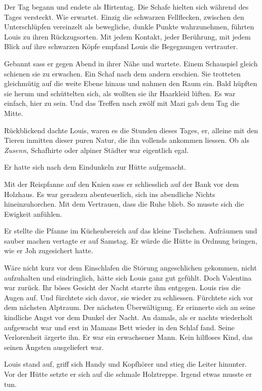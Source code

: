 Der Tag begann und endete als Hirtentag. Die Schafe hielten sich während
des Tages versteckt. Wie erwartet. Einzig die schwarzen Fellflecken,
zwischen den Unterschlüpfen vereinzelt als bewegliche, dunkle Punkte
wahrzunehmen, führten Louis zu ihren Rückzugsorten. Mit jedem Kontakt,
jeder Berührung, mit jedem Blick auf ihre schwarzen Köpfe empfand Louis
die Begegnungen vertrauter.

Gebannt sass er gegen Abend in ihrer Nähe und wartete. Einem Schauspiel
gleich schienen sie zu erwachen. Ein Schaf nach dem andern erschien. Sie
trotteten gleichmütig auf die weite Ebene hinaus und nahmen den Raum
ein. Bald hüpften sie herum und schüttelten sich, als wollten sie ihr
Haarkleid lüften. Es war einfach, hier zu sein. Und das Treffen nach
zwölf mit Mazi gab dem Tag die Mitte.

Rückblickend dachte Louis, waren es die Stunden dieses Tages, er,
alleine mit den Tieren inmitten dieser puren Natur, die ihn vollends
ankommen liessen. Ob als \emph{Zusenn,} Schafhirte oder alpiner Städter
war eigentlich egal.

Er hatte sich nach dem Eindunkeln zur Hütte aufgemacht.

Mit der Reispfanne auf den Knien sass er schliesslich auf der Bank vor
dem Holzhaus. Es war geradezu abenteuerlich, sich ins abendliche Nichts
hineinzuhorchen. Mit dem Vertrauen, dass die Ruhe blieb. So musste sich
die Ewigkeit anfühlen.

Er stellte die Pfanne im Küchenbereich auf das kleine Tischchen.
Aufräumen und sauber machen vertagte er auf Samstag. Er würde die Hütte
in Ordnung bringen, wie er Joh zugesichert hatte.

Wäre nicht kurz vor dem Einschlafen die Störung angeschlichen gekommen,
nicht aufzuhalten und eindringlich, hätte sich Louis ganz gut gefühlt.
Doch Valentina war zurück. Ihr böses Gesicht der Nacht starrte ihm
entgegen. Louis riss die Augen auf. Und fürchtete sich davor, sie wieder
zu schliessen. Fürchtete sich vor dem nächsten Alptraum. Der nächsten
Überwältigung. Er erinnerte sich an seine kindliche Angst vor dem Dunkel
der Nacht. An damals, als er nachts wiederholt aufgewacht war und erst
in Mamans Bett wieder in den Schlaf fand. Seine Verlorenheit ärgerte
ihn. Er war ein erwachsener Mann. Kein hilfloses Kind, das seinen
Ängsten ausgeliefert war.

Louis stand auf, griff sich Handy und Kopfhörer und stieg die Leiter
hinunter. Vor der Hütte setzte er sich auf die schmale Holztreppe.
Irgend etwas musste er tun.

